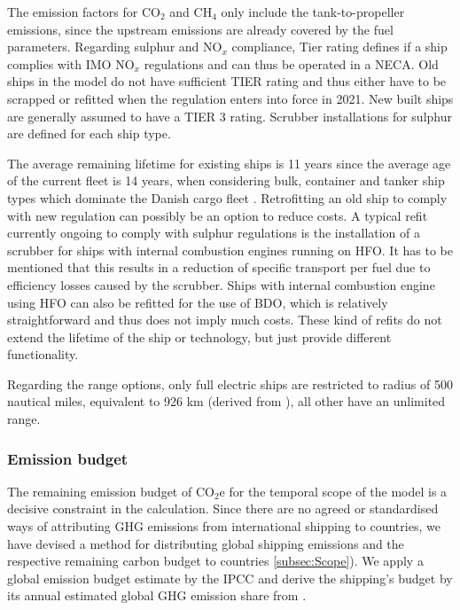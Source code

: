 \documentclass[article]{elsarticle}
\begin{document}
The emission factors for CO$_2$ and CH$_4$ only include the tank-to-propeller emissions, since the upstream emissions are already covered by the fuel parameters. Regarding sulphur and NO$_x$ compliance, Tier rating defines if a ship complies with IMO NO$_x$ regulations and can thus be operated in a NECA. Old ships in the model do not have sufficient TIER rating and thus either have to be scrapped or refitted when the regulation enters into force in 2021. New built ships are generally assumed to have a TIER 3 rating. Scrubber installations for sulphur are defined for each ship type.

The average remaining lifetime for existing ships is 11 years since the average age of the current fleet is 14 years, when considering bulk, container and tanker ship types which dominate the Danish cargo fleet \cite[Tab.~2.2, p.~27]{UNCTAD2017}. Retrofitting an old ship to comply with new regulation can possibly be an option to reduce costs. A typical refit currently ongoing to comply with sulphur regulations is the installation of a scrubber for ships with internal combustion engines running on HFO. It has to be mentioned that this results in a reduction of specific transport per fuel due to efficiency losses caused by the scrubber. Ships with internal combustion engine using HFO can also be refitted for the use of BDO, which is relatively straightforward and thus does not imply much costs. These kind of refits do not extend the lifetime of the ship or technology, but just provide different functionality.

Regarding the range options, only full electric ships are restricted to radius of 500 nautical miles, equivalent to 926 km (derived from \cite{Stensvold2018a}), all other have an unlimited range.


\subsubsection{Emission budget}
\label{subsec:em_budget}
The remaining emission budget of CO$_2$e for the temporal scope of the model is a decisive constraint in the calculation. Since there are no agreed or standardised ways of attributing GHG emissions from international shipping to countries, we have devised a method for distributing global shipping emissions and the respective remaining carbon budget to countries \ref{subsec:Scope}). We apply a global emission budget estimate by the IPCC \cite[Tab.~SPM.3, RCP2.6]{IPCC2013} and derive the shipping's budget by its annual estimated global GHG emission share from \citet{Olmer2017}.
\end{document}
